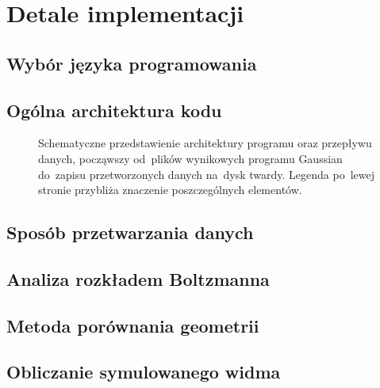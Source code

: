 \section{Detale implementacji}\label{tesliper:implementation}
\subsection{Wybór języka programowania}\label{implementation:language}
\subsection{Ogólna architektura kodu}\label{implementation:architecture}
\begin{figure}
  
  \caption{
    Schematyczne przedstawienie architektury programu \tesliper{} oraz przepływu danych,
      począwszy od~plików wynikowych programu Gaussian do~zapisu przetworzonych danych
      na~dysk twardy.
    Legenda po~lewej stronie przybliża znaczenie poszczególnych elementów.
  }
  \label{fig:class-diagram}
\end{figure}
\subsection{Sposób przetwarzania danych}\label{implementation:parsing}
\subsection{Analiza rozkładem Boltzmanna}\label{implementation:boltzmann}
\subsection{Metoda porównania geometrii}\label{implementation:rmsd}
\subsection{Obliczanie symulowanego widma}\label{implementation:spectra}

